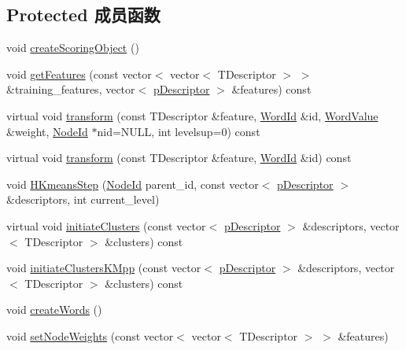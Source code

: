 \subsection*{Protected 成员函数}
\begin{DoxyCompactItemize}
\item 
void \hyperlink{classDBoW2_1_1TemplatedVocabulary_a3244d5a3d0f75ba9c9ae905c5365335d}{create\-Scoring\-Object} ()
\item 
void \hyperlink{classDBoW2_1_1TemplatedVocabulary_aea3a7a5d8944a9c71982921d4f3786fa}{get\-Features} (const vector$<$ vector$<$ T\-Descriptor $>$ $>$ \&training\-\_\-features, vector$<$ \hyperlink{classDBoW2_1_1TemplatedVocabulary_a40913d67e369e6993c2eab80a968f829}{p\-Descriptor} $>$ \&features) const 
\item 
virtual void \hyperlink{classDBoW2_1_1TemplatedVocabulary_a41e77294037788a9b2744f89ac64ecea}{transform} (const T\-Descriptor \&feature, \hyperlink{namespaceDBoW2_ab1a0d3283b2d4690a383372ed20bfeb5}{Word\-Id} \&id, \hyperlink{namespaceDBoW2_a55fcd7333e591a38e96b91f41bc182f6}{Word\-Value} \&weight, \hyperlink{namespaceDBoW2_a3a0fa9c50c0df508759362d6204566f2}{Node\-Id} $\ast$nid=N\-U\-L\-L, int levelsup=0) const 
\item 
virtual void \hyperlink{classDBoW2_1_1TemplatedVocabulary_a4369ffc35f61467b0987a89fcc5a7224}{transform} (const T\-Descriptor \&feature, \hyperlink{namespaceDBoW2_ab1a0d3283b2d4690a383372ed20bfeb5}{Word\-Id} \&id) const 
\item 
void \hyperlink{classDBoW2_1_1TemplatedVocabulary_ab79623d30a8550414e1f4bf916869f05}{H\-Kmeans\-Step} (\hyperlink{namespaceDBoW2_a3a0fa9c50c0df508759362d6204566f2}{Node\-Id} parent\-\_\-id, const vector$<$ \hyperlink{classDBoW2_1_1TemplatedVocabulary_a40913d67e369e6993c2eab80a968f829}{p\-Descriptor} $>$ \&descriptors, int current\-\_\-level)
\item 
virtual void \hyperlink{classDBoW2_1_1TemplatedVocabulary_a41c464fe0d2f043bbef17ab01cc46e14}{initiate\-Clusters} (const vector$<$ \hyperlink{classDBoW2_1_1TemplatedVocabulary_a40913d67e369e6993c2eab80a968f829}{p\-Descriptor} $>$ \&descriptors, vector$<$ T\-Descriptor $>$ \&clusters) const 
\item 
void \hyperlink{classDBoW2_1_1TemplatedVocabulary_ab6a5aedb8c5645d2597a8ca8a3994efe}{initiate\-Clusters\-K\-Mpp} (const vector$<$ \hyperlink{classDBoW2_1_1TemplatedVocabulary_a40913d67e369e6993c2eab80a968f829}{p\-Descriptor} $>$ \&descriptors, vector$<$ T\-Descriptor $>$ \&clusters) const 
\item 
void \hyperlink{classDBoW2_1_1TemplatedVocabulary_a9b74d107b7dc6142cbed4e6ef44a8519}{create\-Words} ()
\item 
void \hyperlink{classDBoW2_1_1TemplatedVocabulary_af7bf0ecd2d1ecc7d31ddca3aa7d1ddc8}{set\-Node\-Weights} (const vector$<$ vector$<$ T\-Descriptor $>$ $>$ \&features)
\end{DoxyCompactItemize}
